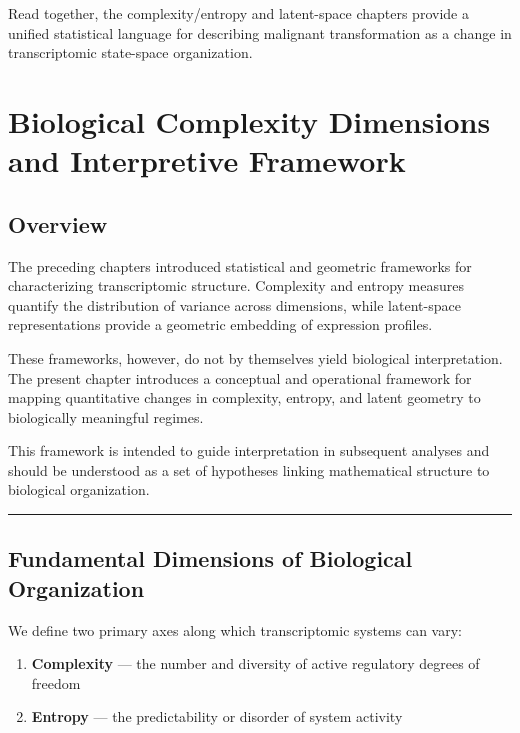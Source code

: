 \documentclass[
  letterpaper,
  DIV=11,
  numbers=noendperiod,
  openany,
  oneside]{scrreprt}
\providecommand{\tightlist}{%
  \setlength{\itemsep}{0pt}\setlength{\parskip}{0pt}}
\begin{document}
Read together, the complexity/entropy and latent-space chapters provide
a unified statistical language for describing malignant transformation
as a change in transcriptomic state-space organization.

\chapter{Biological Complexity Dimensions and Interpretive
Framework}\label{biological-complexity-dimensions-and-interpretive-framework}

\section{Overview}\label{overview-6}

The preceding chapters introduced statistical and geometric frameworks
for characterizing transcriptomic structure. Complexity and entropy
measures quantify the distribution of variance across dimensions, while
latent-space representations provide a geometric embedding of expression
profiles.

These frameworks, however, do not by themselves yield biological
interpretation. The present chapter introduces a conceptual and
operational framework for mapping quantitative changes in complexity,
entropy, and latent geometry to biologically meaningful regimes.

This framework is intended to guide interpretation in subsequent
analyses and should be understood as a set of hypotheses linking
mathematical structure to biological organization.

\begin{center}\rule{0.5\linewidth}{0.5pt}\end{center}

\section{Fundamental Dimensions of Biological
Organization}\label{fundamental-dimensions-of-biological-organization}

We define two primary axes along which transcriptomic systems can vary:

\begin{enumerate}
\def\labelenumi{\arabic{enumi}.}
\tightlist
\item
  \textbf{Complexity} --- the number and diversity of active regulatory
  degrees of freedom\\
\item
  \textbf{Entropy} --- the predictability or disorder of system activity
\end{enumerate}
\end{document}
